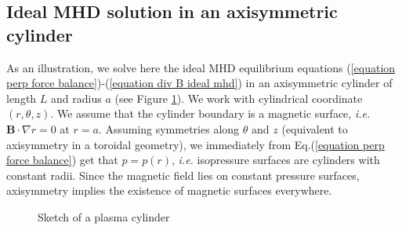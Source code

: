 \documentclass[my_thesis.tex]{subfiles}
\begin{document}
\subsection{Ideal MHD solution in an axisymmetric cylinder}\label{appendix jxb=grad p solution}
As an illustration, we solve here the ideal MHD equilibrium equations (\ref{equation perp force balance})-(\ref{equation div B ideal mhd}) in an axisymmetric cylinder of length $L$ and radius $a$ (see Figure \ref{fig. cylinder sketch}). We work with cylindrical coordinate $(r,\theta,z)$. We assume that the cylinder boundary is a magnetic surface, \textit{i.e.} $\mathbf{B}\cdot\nabla r=0$ at $r=a$. Assuming symmetries along $\theta$ and $z$ (equivalent to axisymmetry in a toroidal geometry), we immediately from Eq.(\ref{equation perp force balance}) get that $p=p(r)$, \textit{i.e.} isopressure surfaces are cylinders with constant radii. Since the magnetic field lies on constant pressure surfaces, axisymmetry implies the existence of magnetic surfaces everywhere.

\begin{figure}
	\centering
	\caption{Sketch of a plasma cylinder}
	\label{fig. cylinder sketch}
\end{figure}
\end{document}
